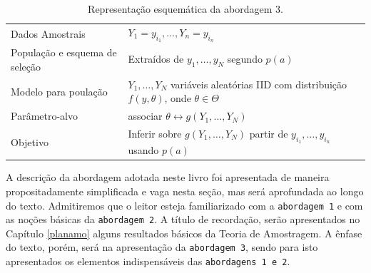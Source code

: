 \documentclass[]{book}
\theoremstyle{definition}
\theoremstyle{definition}
\theoremstyle{definition}
\theoremstyle{remark}
\begin{document}
\begin{longtable}[]{@{}ll@{}}
\caption{\label{tab:modelsuperpop} Representação esquemática da abordagem
3.}\tabularnewline
\toprule
\begin{minipage}[t]{0.29\columnwidth}\raggedright\strut
Dados Amostrais\strut
\end{minipage} & \begin{minipage}[t]{0.60\columnwidth}\raggedright\strut
\(Y_1=y_{i_1},\ldots,Y_n=y_{i_n}\)\strut
\end{minipage}\tabularnewline
\begin{minipage}[t]{0.29\columnwidth}\raggedright\strut
População e esquema de seleção\strut
\end{minipage} & \begin{minipage}[t]{0.60\columnwidth}\raggedright\strut
Extraídos de \(y_1,\dots,y_N\) segundo \(p(a)\)\strut
\end{minipage}\tabularnewline
\begin{minipage}[t]{0.29\columnwidth}\raggedright\strut
Modelo para poulação\strut
\end{minipage} & \begin{minipage}[t]{0.60\columnwidth}\raggedright\strut
\(Y_1, \dots, Y_N\) variáveis aleatórias IID com distribuição
\(f(y,\theta)\), onde \(\theta \in \Theta\)\strut
\end{minipage}\tabularnewline
\begin{minipage}[t]{0.29\columnwidth}\raggedright\strut
Parâmetro-alvo\strut
\end{minipage} & \begin{minipage}[t]{0.60\columnwidth}\raggedright\strut
associar
\(\theta \longleftrightarrow g\left(Y_{1}, \ldots , Y_{N}\right)\)\strut
\end{minipage}\tabularnewline
\begin{minipage}[t]{0.29\columnwidth}\raggedright\strut
Objetivo\strut
\end{minipage} & \begin{minipage}[t]{0.60\columnwidth}\raggedright\strut
Inferir sobre \(g\left( Y_{1}, \ldots , Y_{N}\right)\) partir de
\(y_{i_1},\ldots,y_{i_n}\) usando \(p\left( a\right)\)\strut
\end{minipage}\tabularnewline
\bottomrule
\end{longtable}

A descrição da abordagem adotada neste livro foi apresentada de maneira
propositadamente simplificada e vaga nesta seção, mas será aprofundada
ao longo do texto. Admitiremos que o leitor esteja familiarizado com a
\texttt{abordagem\ 1} e com as noções básicas da \texttt{abordagem\ 2}.
A título de recordação, serão apresentados no Capítulo \ref{planamo}
alguns resultados básicos da Teoria de Amostragem. A ênfase do texto,
porém, será na apresentação da \texttt{abordagem\ 3}, sendo para isto
apresentados os elementos indispensáveis das
\texttt{abordagens\ 1\ e\ 2}.
\end{document}
